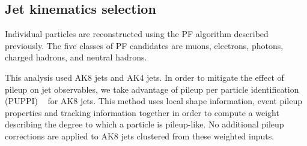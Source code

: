\subsection{Jet kinematics selection\label{ss:JetSel}}

Individual particles are reconstructed using the PF algorithm described previously. The five classes of PF candidates are  muons, electrons, photons, charged hadrons, and neutral hadrons. 

This analysis used AK8 jets and AK4 jets.
In order to mitigate the effect of pileup on jet observables, we take advantage of pileup per particle identification (PUPPI) ~\cite{puppi} for AK8 jets. This method uses local shape information, event pileup properties and tracking information together in order to compute a weight describing the degree to which a particle is pileup-like. No additional pileup corrections are applied to AK8 jets clustered from these weighted inputs.

